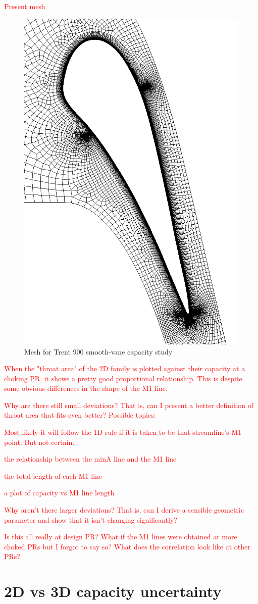\documentclass[a4paper, 11pt, oneside]{report}
\begin{document}
\textcolor{red}{Present mesh}
\begin{figure}[H]
      \centering
      \includegraphics[width=.45\textwidth]{figs/T900_smooth_vane_mesh_placeholder.png}
      \caption{Mesh for Trent 900 smooth-vane capacity study}
      \label{fig:T900_mesh_1}
\end{figure}

\textcolor{red}{When the "throat area" of the 2D family is plotted against their capacity at a choking PR, it shows a pretty good proportional relationship. This is despite some obvious differences in the shape of the M1 line.}

\textcolor{red}{Why are there still small deviations? That is, can I present a better definition of throat area that fits even better? Possible topics:}

\textcolor{red}{Most likely it will follow the 1D rule if it is taken to be that streamline's M1 point. But not certain.}
 
\textcolor{red}{the relationship between the minA line and the M1 line}
 
\textcolor{red}{the total length of each M1 line}
 
\textcolor{red}{a plot of capacity vs M1 line length}

\textcolor{red}{Why aren't there larger deviations? That is, can I derive a sensible geometric parameter and show that it isn't changing significantly?}

\textcolor{red}{Is this all really at design PR? What if the M1 lines were obtained at more choked PRs but I forgot to say so? What does the correlation look like at other PRs?}


\section{2D vs 3D capacity uncertainty}
\label{2d_vs_3d_capacity_uncertainty}
\end{document}

